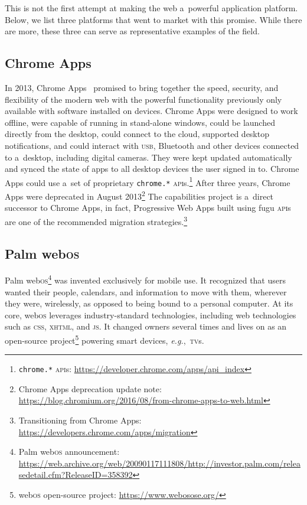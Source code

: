 \documentclass[sigconf, anonymous]{acmart}
\begin{document}
This is not the first attempt at making the web a~powerful application platform.
Below, we list three platforms that went to market with this promise.
While there are more, these three can serve as representative examples of the field.

\subsection{Chrome Apps}

In 2013, Chrome Apps~\cite{kay13} promised to bring together the speed, security,
and flexibility of the modern web with the powerful functionality
previously only available with software installed on devices. 
Chrome Apps were designed to work offline, were capable of running in stand-alone windows,
could be launched directly from the desktop,
could connect to the cloud, supported desktop notifications,
and could interact with \textsc{usb}, Bluetooth and other devices connected to a~desktop,
including digital cameras.
They were kept updated automatically and synced the state of apps
to all desktop devices the user signed in to.
Chrome Apps could use a~set of proprietary \texttt{chrome.*}
\textsc{api}s.\footnote{\texttt{chrome.*}
\textsc{api}s: \url{https://developer.chrome.com/apps/api_index}}
After three years, Chrome Apps were deprecated in August
2013\footnote{Chrome Apps deprecation update note: \url{https://blog.chromium.org/2016/08/from-chrome-apps-to-web.html}}
The capabilities project is a~direct successor to Chrome Apps,
in fact, Progressive Web Apps built using fugu \textsc{api}s
are one of the recommended migration
strategies.\footnote{Transitioning from Chrome Apps: \url{https://developers.chrome.com/apps/migration}}

\subsection{Palm web\textsc{os}}

Palm web\textsc{os}\footnote{Palm web\textsc{os} announcement:
\url{https://web.archive.org/web/20090117111808/http://investor.palm.com/releasedetail.cfm?ReleaseID=358392}}
was invented exclusively for mobile use.
It recognized that users wanted their people, calendars, and information to move with them,
wherever they were, wirelessly, as opposed to being bound to a personal computer.
At its core, web\textsc{os} leverages industry-standard technologies,
including web technologies such as \textsc{css}, \textsc{xhtml}, and \textsc{js}.
It changed owners several times and lives on as an open-source
project\footnote{web\textsc{os} open-source project: \url{https://www.webosose.org/}}
powering smart devices, \textit{e.g.},\ \textsc{tv}s.
\end{document}
